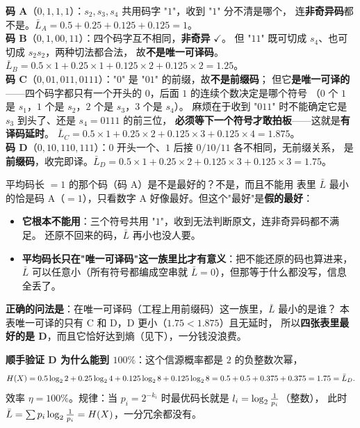 \textbf{码 A}（$0,1,1,1$）：$s_2,s_3,s_4$ 共用码字 "$1$"，收到 "$1$" 分不清是哪个，
连\textbf{非奇异码}都不是。$\bar L_A=0.5+0.25+0.125+0.125=1$。\\
\textbf{码 B}（$0,1,00,11$）：四个码字互不相同，\textbf{非奇异} $\checkmark$。
但 "$11$" 既可切成 $s_4$、也可切成 $s_2s_2$，两种切法都合法，
故\textbf{不是唯一可译码}。$\bar L_B=0.5\times1+0.25\times1+0.125\times2+0.125\times2=1.25$。\\
\textbf{码 C}（$0,01,011,0111$）："$0$" 是 "$01$" 的前缀，故\textbf{不是前缀码}；
但它\textbf{是唯一可译的}——四个码字都只有一个开头的 $0$，后面 $1$ 的连续个数决定是哪个符号
（$0$ 个 $1$ 是 $s_1$，$1$ 个是 $s_2$，$2$ 个是 $s_3$，$3$ 个是 $s_4$）。
麻烦在于收到 "$011$" 时不能确定它是 $s_3$ 到头了、还是 $s_4=0111$ 的前三位，
\textbf{必须等下一个符号才敢拍板}——这就是\textbf{有译码延时}。
$\bar L_C=0.5\times1+0.25\times2+0.125\times3+0.125\times4=1.875$。\\
\textbf{码 D}（$0,10,110,111$）：$0$ 开头一个、$1$ 后接 $0/10/11$ 各不相同，无前缀关系，
是\textbf{前缀码}，收完即译。$\bar L_D=0.5\times1+0.25\times2+0.125\times3+0.125\times3=1.75$。

\begin{idea}{平均码长 $=1$ 的那个码（码 A）是不是最好的？不是，而且不能用}
表里 $\bar L$ 最小的恰是码 A（$=1$），只看数字 A 好像最好。但这个"最好"是\textbf{假的最好}：
\begin{itemize}[leftmargin=1.3em,itemsep=1pt,topsep=2pt]
  \item \textbf{它根本不能用}：三个符号共用 "$1$"，收到无法判断原文，连非奇异码都不满足。
        还原不回来的码，$\bar L$ 再小也没人要。
  \item \textbf{平均码长只在"唯一可译码"这一族里比才有意义}：把不能还原的码也算进来，
        $\bar L$ 可以任意小（所有符号都编成空串就 $\bar L=0$），但那等于什么都没写，信息全丢了。
\end{itemize}
\textbf{正确的问法是}：在唯一可译码（工程上用前缀码）这一族里，$\bar L$ 最小的是谁？
本表唯一可译的只有 C 和 D，D 更小（$1.75<1.875$）且无延时，
所以\textbf{四张表里最好的是 D}，而且它恰好达到熵（见下），一分钱没浪费。
\end{idea}

\textbf{顺手验证 D 为什么能到 $100\%$}：这个信源概率都是 $2$ 的负整数次幂，
\begin{align*}
H\!\left(X\right)=0.5\log_{2} 2+0.25\log_{2} 4+0.125\log_{2} 8+0.125\log_{2} 8
=0.5+0.5+0.375+0.375=1.75=\bar L_D .
\end{align*}
效率 $\eta=100\%$。规律：当 $p_i=2^{-k_i}$ 时最优码长就是 $l_i=\log_{2}\frac{1}{p_i}$（整数），
此时 $\bar L=\sum p_i\log_{2}\frac1{p_i}=H\!\left(X\right)$，一分冗余都没有。

